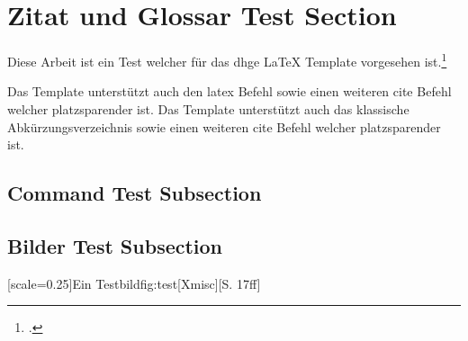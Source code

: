 \section{Zitat und Glossar Test Section}

Diese Arbeit ist ein Test welcher f\"ur das \ac{dhge} LaTeX Template vorgesehen ist.\footcite{Xmisc}

\if{}
Das Template unterstützt auch den \gls{latex} Befehl sowie einen weiteren cite Befehl welcher platzsparender ist.\supercite{Xmisc}
\else
Das Template unterstützt auch das klassische Abkürzungsverzeichnis sowie einen weiteren cite Befehl welcher platzsparender ist.\supercite{Xmisc}
\fi

\cleardoublepage

\subsection{Command Test Subsection}

\doubleunderline{$150\mathrm{\Omega}$}

\subsection{Bilder Test Subsection}

[scale=0.25]{Ein Testbild}{fig:test}[Xmisc][S. 17ff]
